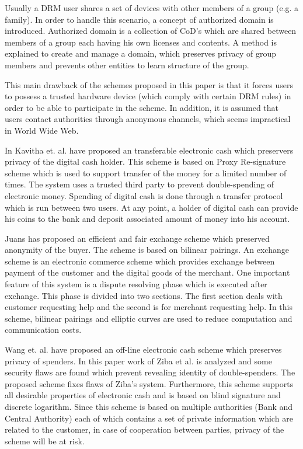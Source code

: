 \documentclass[times]{secauth}
\begin{document}
Usually a DRM user shares a set of devices with other members of a group (e.g. a family). In order to handle this scenario, a concept of authorized domain is introduced. Authorized domain is a collection of CoD's which are shared between members of a group each having his own licenses and contents. A method is explained to create and manage a domain, which preserves privacy of group members and prevents other entities to learn structure of the group.

This main drawback of the schemes proposed in this paper is that it forces users to possess a trusted hardware device (which comply with certain DRM rules) in order to be able to participate in the scheme. In addition, it is assumed that users contact authorities through anonymous channels, which seems impractical in World Wide Web. 

In \cite{ANEWT} Kavitha et. al. have proposed an transferable electronic cash which preservers privacy of the digital cash holder. This scheme is based on Proxy Re-signature scheme which is used to support transfer of the money for a limited number of times. The system uses a trusted third party to prevent double-spending of electronic money. Spending of digital cash is done through a transfer protocol which is run between two users. At any point, a holder of digital cash can provide his coins to the bank and deposit associated amount of money into his account. 

Juans \cite{ANEFFFAIR} has proposed an efficient and fair exchange scheme which preserved anonymity of the buyer. The scheme is based on bilinear pairings. An exchange scheme is an electronic commerce scheme which provides exchange between payment of the customer and the digital goods of the merchant. One important feature of this system is a dispute resolving phase which is executed after exchange. This phase is divided into two sections. The first section deals with customer requesting help and the second is for merchant requesting help. In this scheme, bilinear pairings and elliptic curves are used to reduce computation and communication costs. 

Wang et. al. \cite{ANIMOFF} have proposed an off-line electronic cash scheme which preserves privacy of spenders. In this paper work of Ziba et al. \cite{Eslami201159} is analyzed and some security flaws are found which prevent revealing identity of double-spenders. The proposed scheme fixes flaws of Ziba's system. Furthermore, this scheme supports all desirable properties of electronic cash and is based on blind signature and discrete logarithm. Since this scheme is based on multiple authorities (Bank and Central Authority) each of which contains a set of private information which are related to the customer, in case of cooperation between parties, privacy of the scheme will be at risk.
\end{document}
